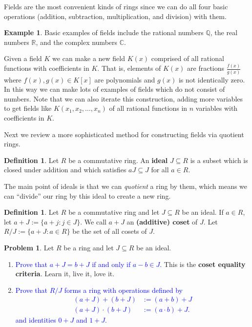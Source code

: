 \documentclass[11pt]{article}
\def\QQ{\mathbb{Q}}
\def\RR{\mathbb{R}}
\def\CC{\mathbb{C}}
\theoremstyle{definition}
\newtheorem{definition}[theorem]{Definition}
\newtheorem{example}[theorem]{Example}
\newtheorem{problem}{Problem}[section]
\numberwithin{equation}{subsection}
\newcommand{\blue}[1]{\textcolor{blue}{#1}}
\begin{document}
Fields are the most convenient kinds of rings since we can do all four basic operations (addition, subtraction, multiplication, and division) with them.

\begin{example}
    Basic examples of fields include the rational numbers $\QQ$, the real numbers $\RR$, and the complex numbers $\CC$.
\end{example}

Given a field $K$ we can make a new field $K(x)$ comprised of all rational functions with coefficients in $K$.
That is, elements of $K(x)$ are fractions $\frac{f(x)}{g(x)}$ where $f(x), g(x) \in K[x]$ are polynomials and $g(x)$ is not identically zero.
In this way we can make lots of examples of fields which do not consist of numbers.
Note that we can also iterate this construction, adding more variables to get fields like $K(x_1, x_2,\ldots, x_n)$ of all rational functions in $n$ variables with coefficients in $K$.

Next we review a more sophisticated method for constructing fields via quotient rings.

\begin{definition}
    Let $R$ be a commutative ring.
    An \textbf{ideal} $J \subseteq R$ is a subset which is closed under addition and which satisfies $a J \subseteq J$ for all $a \in R$.
\end{definition}

The main point of ideals is that we can \emph{quotient} a ring by them, which means we can ``divide'' our ring by this ideal to create a new ring.

\begin{definition}
    Let $R$ be a commutative ring and let $J \subseteq R$ be an ideal.
    If $a \in R$, let $a + J := \{a + j : j \in J\}$.
    We call $a + J$ an \textbf{(additive) coset} of $J$.
    Let $R/J := \{a + J : a \in R\}$ be the set of all cosets of $J$.
\end{definition}

\begin{problem}
    Let $R$ be a ring and let $J \subseteq R$ be an ideal.
    \begin{enumerate}
        \item \blue{Prove that $a + J = b + J$ if and only if $a - b \in J$.}
        This is the \textbf{coset equality criteria}.
        Learn it, live it, love it.

        \item \blue{Prove that $R/J$ forms a ring with operations defined by
        \begin{align*}
            (a + J) + (b + J) &:= (a + b) + J\\
            (a + J) \cdot (b + J) &:= (a\cdot b) + J.
        \end{align*}
        and identities $0 + J$ and $1 + J$.
        }
    \end{enumerate}
    
\end{problem}
\end{document}

